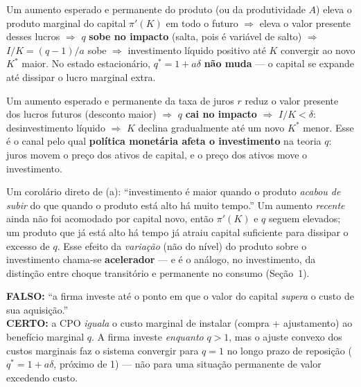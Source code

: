 \documentclass[12pt, a4paper]{article}
\begin{document}
\begin{fatorbox}[title={a) Como o produto esperado afeta o investimento}]
Um aumento esperado e permanente do produto (ou da produtividade $A$) eleva
o produto marginal do capital $\pi'(K)$ em todo o futuro $\Rightarrow$ eleva
o valor presente desses lucros $\Rightarrow$ $q$ \textbf{sobe no impacto}
(salta, pois é variável de salto) $\Rightarrow$ $I/K=(q-1)/a$ sobe
$\Rightarrow$ investimento líquido positivo até $K$ convergir ao novo $K^*$
maior. No estado estacionário, $q^*=1+a\delta$ \textbf{não muda} --- o
capital se expande até dissipar o lucro marginal extra.
\end{fatorbox}

\begin{fatorbox}[title={b) Como o juro esperado afeta o investimento}]
Um aumento esperado e permanente da taxa de juros $r$ reduz o valor presente
dos lucros futuros (desconto maior) $\Rightarrow$ $q$ \textbf{cai no
impacto} $\Rightarrow$ $I/K<\delta$: desinvestimento líquido $\Rightarrow$
$K$ declina gradualmente até um novo $K^*$ menor. Esse é o canal pelo qual
\textbf{política monetária afeta o investimento} na teoria $q$: juros movem
o preço dos ativos de capital, e o preço dos ativos move o investimento.
\end{fatorbox}

\begin{fatorbox}[title={O acelerador (slide do Prof. Ramalhete, Aula 11)}]
Um corolário direto de (a): ``investimento é maior quando o produto
\emph{acabou de subir} do que quando o produto está alto há muito tempo.''
Um aumento \emph{recente} ainda não foi acomodado por capital novo, então
$\pi'(K)$ e $q$ seguem elevados; um produto que já está alto há tempo já
atraiu capital suficiente para dissipar o excesso de $q$. Esse efeito da
\emph{variação} (não do nível) do produto sobre o investimento chama-se
\textbf{acelerador} --- e é o análogo, no investimento, da distinção entre
choque transitório e permanente no consumo (Seção~1).
\end{fatorbox}

\begin{armbox}[title={Armadilha (P2-2021 Q2-i): ``supera'' não é a CPO}]
\textbf{FALSO:} ``a firma investe até o ponto em que o valor do capital
\emph{supera} o custo de sua aquisição.'' \\
\textbf{CERTO:} a CPO \emph{iguala} o custo marginal de instalar (compra +
ajustamento) ao benefício marginal $q$. A firma investe \emph{enquanto}
$q>1$, mas o ajuste convexo dos custos marginais faz o sistema convergir
para $q=1$ no longo prazo de reposição ($q^*=1+a\delta$, próximo de 1) ---
não para uma situação permanente de valor excedendo custo.
\end{armbox}
\end{document}
